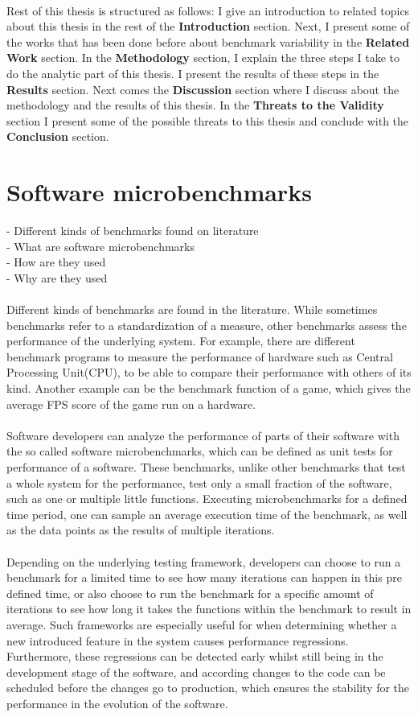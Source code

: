 \documentclass{seal_thesis}
\begin{document}
\\ 
Rest of this thesis is structured as follows: I give an introduction to related topics about this thesis in the rest of the \textbf{Introduction} section. Next, I present some of the works that has been done before about benchmark variability in the \textbf{Related Work} section. In the \textbf{Methodology} section, I explain the three steps I take to do the analytic part of this thesis. I present the results of these steps in the \textbf{Results} section. Next comes the \textbf{Discussion} section where I discuss about the methodology and the results of this thesis. In the \textbf{Threats to the Validity} section I present some of the possible threats to this thesis and conclude with the \textbf{Conclusion} section.

\section{Software microbenchmarks}
- Different kinds of benchmarks found on literature \\
- What are software microbenchmarks \\
- How are they used \\
- Why are they used \\
\\
Different kinds of benchmarks are found in the literature. While sometimes benchmarks refer to a standardization of a measure, other benchmarks assess the performance of the underlying system. For example, there are different benchmark programs to measure the performance of hardware such as Central Processing Unit(CPU), to be able to compare their performance with others of its kind. Another example can be the benchmark function of a game, which gives the average FPS score of the game run on a hardware.\\
\\
Software developers can analyze the performance of parts of their software with the so called software microbenchmarks, which can be defined as unit tests for performance of a software. These benchmarks, unlike other benchmarks that test a whole system for the performance, test only a small fraction of the software, such as one or multiple little functions. Executing microbenchmarks for a defined time period, one can sample an average execution time of the benchmark, as well as the data points as the results of multiple iterations.\\
\\
Depending on the underlying testing framework, developers can choose to run a benchmark for a limited time to see how many iterations can happen in this pre defined time, or also choose to run the benchmark for a specific amount of iterations to see how long it takes the functions within the benchmark to result in average. Such frameworks are especially useful for when determining whether a new introduced feature in the system causes performance regressions. Furthermore, these regressions can be detected early whilst still being in the development stage of the software, and according changes to the code can be scheduled before the changes go to production, which ensures the stability for the performance in the evolution of the software.
\end{document}
